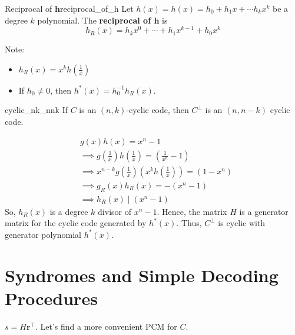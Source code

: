 \begin{Definition}{Reciprocal of $\symbf{h}$}{reciprocal_of_h}
    Let $ h(x)=h(x)=h_{0}+h_{1} x+\cdots h_k x^{k} $ be a degree $ k $
    polynomial. The \textbf{reciprocal of $\symbf{h}$} is
    \[ h_{R}(x)=h_k x^{0}+\cdots+h_{1}x^{k-1}+h_{0}x^{k} \]
\end{Definition}

Note:
\begin{itemize}
    \item $ h_R(x)=x^k h\left( \frac{1}{x} \right) $
    \item If $ h_0\neq 0 $, then $ h^*(x)=h_{0}^{-1}h_R(x) $.
\end{itemize}

\begin{Theorem}{}{cyclic_nk_nnk}
    If $ C $ is an $ (n,k) $-cyclic code, then $ C^{\perp} $ is an
    $ (n,n-k) $ cyclic code.
\end{Theorem}

\begin{Proof}{}{}
    \begin{align*}
         & g(x)h(x)=x^n-1                                                                                   \\
         & \implies g\left( \frac{1}{x} \right)h\left( \frac{1}{x}  \right)= \left( \frac{1}{x^n}-1 \right) \\
         & \implies x^{n-k}g\left( \frac{1}{x}  \right)\left( x^k h\left( \frac{1}{x} \right) \right)=
        (1-x^n)                                                                                             \\
         & \implies g_R(x)h_R(x)=-(x^n-1)                                                                   \\
         & \implies h_R(x)\mid (x^n-1)
    \end{align*}
    So, $ h_R(x) $ is a degree $ k $ divisor of $ x^n-1 $. Hence, the matrix
    $ H $ is a generator matrix for the cyclic code generated by $ h^*(x) $.
    Thus, $ C^{\perp} $ is cyclic with generator polynomial $ h^*(x) $.
\end{Proof}

\section{Syndromes and Simple Decoding Procedures}
$ s=H\symbf{r}^\top $. Let's find a more convenient PCM for $ C $.

